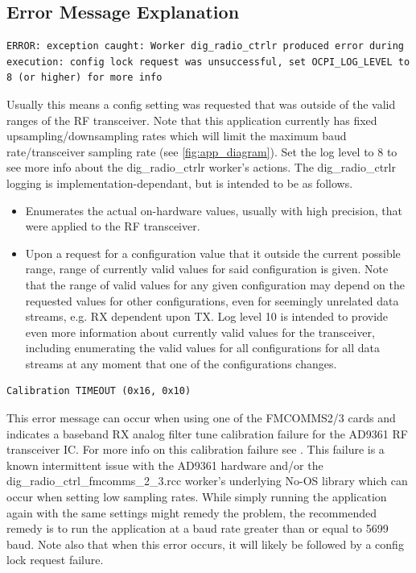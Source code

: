   \subsection{Error Message Explanation}
    \begin{lstlisting}
ERROR: exception caught: Worker dig_radio_ctrlr produced error during execution: config lock request was unsuccessful, set OCPI_LOG_LEVEL to 8 (or higher) for more info
    \end{lstlisting}
    Usually this means a config setting was requested that was outside of the
    valid ranges of the RF transceiver.
    Note that this application currently has fixed upsampling/downsampling rates
    which will limit the maximum baud rate/transceiver sampling rate
    (see \ref{fig:app_diagram}).
    Set the log level to 8 to see more info about the dig\_radio\_ctrlr worker's
    actions.
    The dig\_radio\_ctrlr logging is implementation-dependant, but is intended
    to
    be as follows.
    \begin{itemize}
      \item Enumerates the actual on-hardware values, usually with high
        precision,
        that were applied to the RF
        transceiver.
      \item Upon a request for a configuration value that it outside the current
        possible range, range of currently valid values for said configuration
        is given. Note that the range of valid values for any given
        configuration
        may depend on the requested values for other configurations, even
        for seemingly unrelated data streams, e.g. RX dependent upon TX.
    Log level 10 is intended to provide even more information about currently
    valid
    values for the transceiver, including enumerating the valid values for all
    configurations for all data streams at any moment that one of the
    configurations changes.
    \end{itemize}

    \begin{lstlisting}
Calibration TIMEOUT (0x16, 0x10)
    \end{lstlisting}
    This error message can occur when using one of
    the FMCOMMS2/3 cards and 
    indicates a baseband RX analog filter tune calibration failure for
    the AD9361 RF transceiver IC. For more info on this calibration failure
    see \cite{adi_ug570}.
    This failure is a known intermittent issue with the AD9361 hardware
    and/or the
    dig\_radio\_ctrl\_fmcomms\_2\_3.rcc worker's underlying No-OS library which
    can occur when setting low sampling rates.
    While simply running the application again with the same settings might
    remedy the problem, the
    recommended remedy is to run the application at a baud rate greater than
    or equal to 5699 baud.
    Note also that when this error occurs, it will likely be followed by a
    config lock request
    failure.

